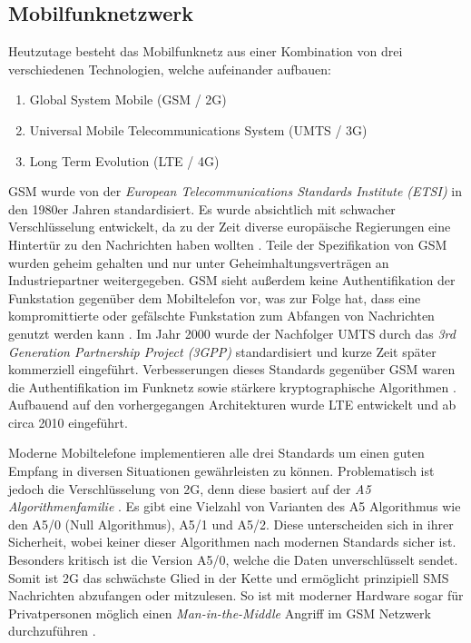 \documentclass[11pt,a4paper,ngerman]{scrreprt}
\begin{document}
\subsection{Mobilfunknetzwerk}
Heutzutage besteht das Mobilfunknetz aus einer Kombination von drei verschiedenen Technologien, welche aufeinander aufbauen:
\begin{enumerate}
    \item Global System Mobile (GSM / 2G)
    \item Universal Mobile Telecommunications System (UMTS / 3G)
    \item Long Term Evolution (LTE / 4G)
\end{enumerate}
GSM wurde von der \textit{European  Telecommunications  Standards  Institute (ETSI)} in den 1980er Jahren standardisiert. Es wurde absichtlich mit schwacher Verschlüsselung entwickelt, da zu der Zeit diverse europäische Regierungen eine Hintertür zu den Nachrichten haben wollten \cite{mobileSec}. Teile der Spezifikation von GSM wurden geheim gehalten und nur unter Geheimhaltungsverträgen an Industriepartner weitergegeben. GSM sieht außerdem keine Authentifikation der Funkstation gegenüber dem Mobiltelefon vor, was zur Folge hat, dass eine kompromittierte oder gefälschte Funkstation zum Abfangen von Nachrichten genutzt werden kann \cite[S.\,202]{komSec13}. Im Jahr 2000 wurde der Nachfolger UMTS durch das \textit{3rd Generation Partnership Project (3GPP)} standardisiert und kurze Zeit später kommerziell eingeführt. Verbesserungen dieses Standards gegenüber GSM waren die Authentifikation im Funknetz sowie stärkere kryptographische Algorithmen \cite[S.\,203]{komSec13}. Aufbauend auf den vorhergegangen Architekturen wurde LTE entwickelt und ab circa 2010 eingeführt.

Moderne Mobiltelefone implementieren alle drei Standards um einen guten Empfang in diversen Situationen gewährleisten zu können. Problematisch ist jedoch die Verschlüsselung von 2G, denn diese basiert auf der \emph{A5 Algorithmenfamilie} \cite{mobileSec}. Es gibt eine Vielzahl von Varianten des A5 Algorithmus wie den A5/0 (Null Algorithmus), A5/1 und A5/2. Diese unterscheiden sich in ihrer Sicherheit, wobei keiner dieser Algorithmen nach modernen Standards sicher ist. Besonders kritisch ist die Version A5/0, welche die Daten unverschlüsselt sendet. Somit ist 2G das schwächste Glied in der Kette und ermöglicht prinzipiell SMS Nachrichten abzufangen oder mitzulesen. So ist mit moderner Hardware sogar für Privatpersonen möglich einen \textit{Man-in-the-Middle} Angriff im GSM Netzwerk durchzuführen \cite[S.\,202]{komSec13}.
\end{document}
